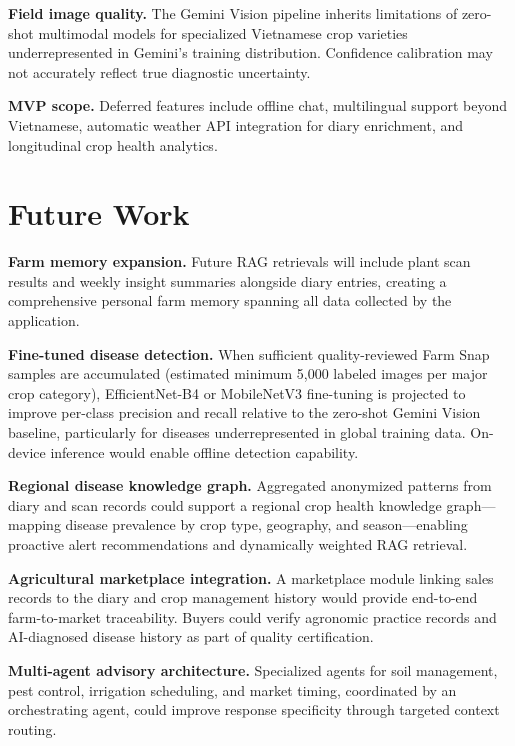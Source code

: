 \documentclass[conference]{IEEEtran}
\begin{document}
\textbf{Field image quality.} The Gemini Vision pipeline inherits limitations of zero-shot multimodal models for specialized Vietnamese crop varieties underrepresented in Gemini's training distribution. Confidence calibration may not accurately reflect true diagnostic uncertainty.

\textbf{MVP scope.} Deferred features include offline chat, multilingual support beyond Vietnamese, automatic weather API integration for diary enrichment, and longitudinal crop health analytics.

\section{Future Work}

\textbf{Farm memory expansion.} Future RAG retrievals will include plant scan results and weekly insight summaries alongside diary entries, creating a comprehensive personal farm memory spanning all data collected by the application.

\textbf{Fine-tuned disease detection.} When sufficient quality-reviewed Farm Snap samples are accumulated (estimated minimum 5,000 labeled images per major crop category), EfficientNet-B4 or MobileNetV3 fine-tuning is projected to improve per-class precision and recall relative to the zero-shot Gemini Vision baseline, particularly for diseases underrepresented in global training data. On-device inference would enable offline detection capability.

\textbf{Regional disease knowledge graph.} Aggregated anonymized patterns from diary and scan records could support a regional crop health knowledge graph---mapping disease prevalence by crop type, geography, and season---enabling proactive alert recommendations and dynamically weighted RAG retrieval.

\textbf{Agricultural marketplace integration.} A marketplace module linking sales records to the diary and crop management history would provide end-to-end farm-to-market traceability. Buyers could verify agronomic practice records and AI-diagnosed disease history as part of quality certification.

\textbf{Multi-agent advisory architecture.} Specialized agents for soil management, pest control, irrigation scheduling, and market timing, coordinated by an orchestrating agent, could improve response specificity through targeted context routing.
\end{document}
